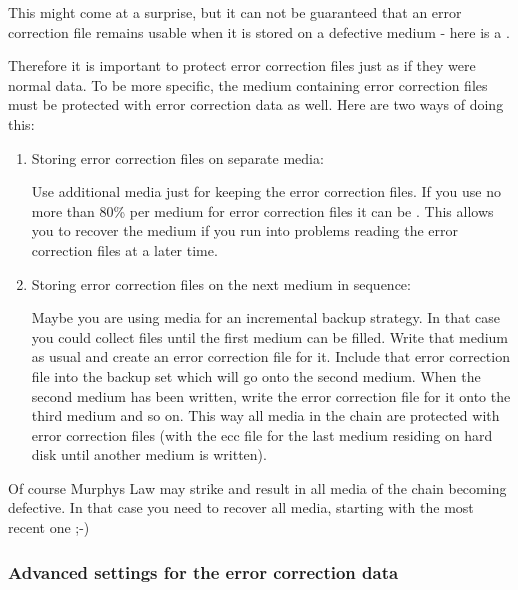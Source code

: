 \medskip

This might come at a surprise, but it can not be
guaranteed that an error correction file remains usable
when it is stored on a defective medium - here
is a .\marginpar{\hfill\rule{1mm}{13mm}} 

\medskip

Therefore it is important to protect error correction files just as
if they were normal data. To be more specific, the medium containing
error correction files must be protected with error correction data as well.
Here are two ways of doing this:

\begin{enumerate}
\item Storing error correction files on separate media:

Use additional media just for keeping the error correction files.
If you use no more than 80\% per medium for error correction files
it can be .
This allows you to recover the medium if you run into problems reading
the error correction files at a later time.

\item Storing error correction files on the next medium in sequence:

Maybe you are using media for an incremental backup strategy.
In that case you could collect files until the first medium can be filled.
Write that medium as usual and create an error correction file for it.
Include that error correction file into the backup set which will go onto
the second medium. When the second medium has been written, write the error
correction file for it onto the third medium and so on. This way all media
in the chain are protected with error correction files (with the ecc file
for the last medium residing on hard disk until another medium is written).
\end{enumerate}

Of course Murphys Law may strike and result in all media of the chain
becoming defective. In that case you need to recover all media, starting
with the most recent one ;-)

\newpage
\subsubsection{Advanced settings for the error correction data}
\label{howto-eccfile-advanced-settings}
\label{howto-eccfile-advanced-settings-image}

